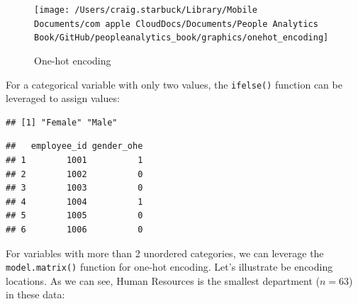 \documentclass[
]{book}
\newenvironment{Shaded}{\begin{snugshade}}{\end{snugshade}}
\newcommand{\AttributeTok}[1]{\textcolor[rgb]{0.77,0.63,0.00}{#1}}
\newcommand{\CommentTok}[1]{\textcolor[rgb]{0.56,0.35,0.01}{\textit{#1}}}
\newcommand{\DecValTok}[1]{\textcolor[rgb]{0.00,0.00,0.81}{#1}}
\newcommand{\FunctionTok}[1]{\textcolor[rgb]{0.00,0.00,0.00}{#1}}
\newcommand{\NormalTok}[1]{#1}
\newcommand{\OtherTok}[1]{\textcolor[rgb]{0.56,0.35,0.01}{#1}}
\newcommand{\SpecialCharTok}[1]{\textcolor[rgb]{0.00,0.00,0.00}{#1}}
\newcommand{\StringTok}[1]{\textcolor[rgb]{0.31,0.60,0.02}{#1}}
\begin{document}
\begin{figure}

{\centering \texttt{[image: /Users/craig.starbuck/Library/Mobile Documents/com~apple~CloudDocs/Documents/People Analytics Book/GitHub/peopleanalytics\_book/graphics/onehot\_encoding]} 

}

\caption{One-hot encoding}\label{fig:onehot-encoding}
\end{figure}

For a categorical variable with only two values, the \texttt{ifelse()} function can be leveraged to assign values:

\begin{Shaded}
\end{Shaded}

\begin{verbatim}
## [1] "Female" "Male"
\end{verbatim}

\begin{Shaded}
\end{Shaded}

\begin{verbatim}
##   employee_id gender_ohe
## 1        1001          1
## 2        1002          0
## 3        1003          0
## 4        1004          1
## 5        1005          0
## 6        1006          0
\end{verbatim}

For variables with more than 2 unordered categories, we can leverage the \texttt{model.matrix()} function for one-hot encoding. Let's illustrate be encoding locations. As we can see, Human Resources is the smallest department (\(n = 63\)) in these data:
\end{document}
